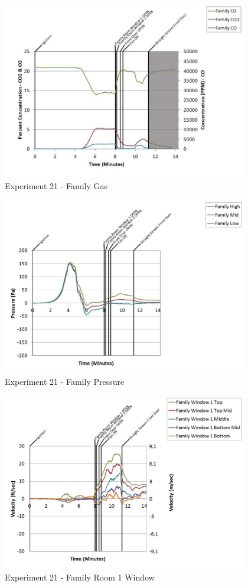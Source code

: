 \documentclass{article}
\begin{document}
\begin{appendices}
	\begin{figure}[h!]
		\centering
		\includegraphics[height=3.05in]{0_Images/Results_Charts/Exp_21_Charts/FamilyGas.pdf}
		\caption{Experiment 21 - Family Gas}
	\end{figure}
 
	\clearpage

	\begin{figure}[h!]
		\centering
		\includegraphics[height=3.05in]{0_Images/Results_Charts/Exp_21_Charts/FamilyPressure.pdf}
		\caption{Experiment 21 - Family Pressure}
	\end{figure}
 

	\begin{figure}[h!]
		\centering
		\includegraphics[height=3.05in]{0_Images/Results_Charts/Exp_21_Charts/FamilyRoom1Window.pdf}
		\caption{Experiment 21 - Family Room 1 Window}
	\end{figure}
 

\end{appendices}
\end{document}
